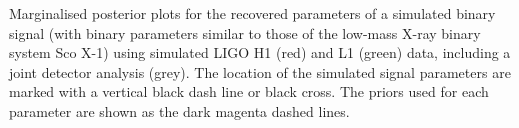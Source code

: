 \label{fig:scox1_inj}
Marginalised posterior plots for the recovered parameters of a simulated binary signal (with binary parameters
similar to those of the low-mass X-ray binary system Sco X-1) using simulated LIGO H1 (red) and L1 (green) data, including a joint detector analysis
(grey). The location of the simulated signal parameters are marked with a vertical black dash line or black
cross. The priors used for each parameter are shown as the dark magenta dashed lines.
